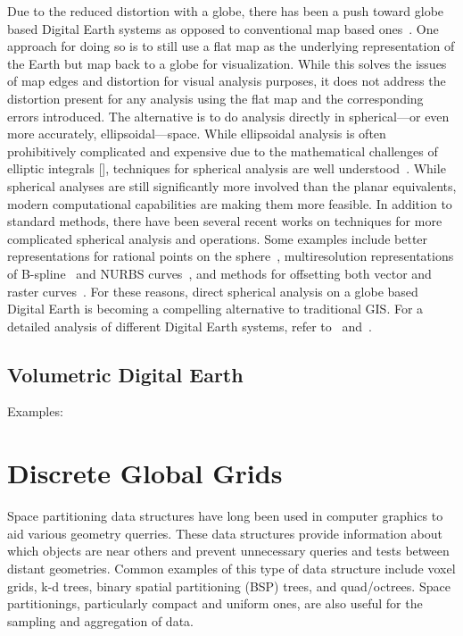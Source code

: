 Due to the reduced distortion with a globe, there has been a push toward globe based Digital Earth systems as opposed to conventional map based ones~\cite{goodchild2018reimagining}.
One approach for doing so is to still use a flat map as the underlying representation of the Earth but map back to a globe for visualization.
While this solves the issues of map edges and distortion for visual analysis purposes, it does not address the distortion present for any analysis using the flat map and the corresponding errors introduced.
The alternative is to do analysis directly in spherical---or even more accurately, ellipsoidal---space.
While ellipsoidal analysis is often prohibitively complicated and expensive due to the mathematical challenges of elliptic integrals [], techniques for spherical analysis are well understood~\cite{raskin1994spatial}.
While spherical analyses are still significantly more involved than the planar equivalents, modern computational capabilities are making them more feasible. 
In addition to standard methods, there have been several recent works on techniques for more complicated spherical analysis and operations.
Some examples include better representations for rational points on the sphere~\cite{bahrdt2017rational}, multiresolution representations of B-spline~\cite{alderson2016multiresolution} and NURBS curves~\cite{alderson2019multiscale}, and methods for offsetting both vector and raster curves~\cite{alderson2018offsetting}.
For these reasons, direct spherical analysis on a globe based Digital Earth is becoming a compelling alternative to traditional GIS. For a detailed analysis of different Digital Earth systems, refer to~\cite{mahdavi2015survey} and~\cite{alderson2020digital}.


\subsection{Volumetric Digital Earth} \label{chap:2:VDE}
Examples: 


\section{Discrete Global Grids} \label{chap:2:DGG}
Space partitioning data structures have long been used in computer graphics to aid various geometry querries.
These data structures provide information about which objects are near others and prevent unnecessary queries and tests between distant geometries.
Common examples of this type of data structure include voxel grids, k-d trees, binary spatial partitioning (BSP) trees, and quad/octrees.
Space partitionings, particularly compact and uniform ones, are also useful for the sampling and aggregation of data. 


